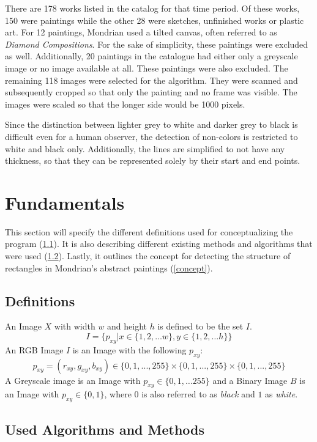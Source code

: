 \documentclass[serif,article,noparskip]{agse-thesis}
\begin{document}
There are 178 works listed in the catalog for that time period. Of these works,
150 were paintings while the other 28 were sketches, unfinished works or plastic
art. For 12 paintings, Mondrian used a tilted canvas, often referred to as
\textit{Diamond Compositions}. For the sake of simplicity, these paintings were
excluded as well. Additionally, 20 paintings in the catalogue had either only a
greyscale image or no image available at all. These paintings were also
excluded. The remaining 118 images were selected for the algorithm. They were
scanned and subsequently cropped so that only the painting and no frame was
visible. The images were scaled so that the longer side would be 1000 pixels.

Since the distinction between lighter grey to white and darker grey to black is
difficult even for a human observer, the detection of non-colors is restricted
to white and black only. Additionally, the lines are simplified to not have any
thickness, so that they can be represented solely by their start and end points.

\section{Fundamentals} \label{fundamentals}

This section will specify the different definitions used for conceptualizing the
program (\ref{definitions}). It is also describing different existing methods
and algorithms that were used (\ref{used}). Lastly, it outlines the concept for
detecting the structure of rectangles in Mondrian's abstract paintings
(\ref{concept}).

\subsection{Definitions} \label{definitions}

An Image $X$ with width $w$ and height $h$ is defined to be the set $I$. $$I =
\{p_{xy} | x \in \{1,2, \dots w\}, y \in \{1,2, \dots h\} \}$$ An RGB Image $I$
is an Image with the following  $p_{xy}$: $$p_{xy} = (r_{xy}, g_{xy}, b_{xy})
\in \{0,1,...,255\} \times \{0,1,...,255\} \times\{0,1,...,255\}$$ A Greyscale
image is an Image with $p_{xy} \in \{0,1, \dots 255\}$ and a Binary Image $B$ is
an Image with $p_{xy} \in \{0,1\}$, where $0$ is also referred to as
\textit{black} and $1$ as \textit{white}.

\subsection{Used Algorithms and Methods} \label{used}
\end{document}
